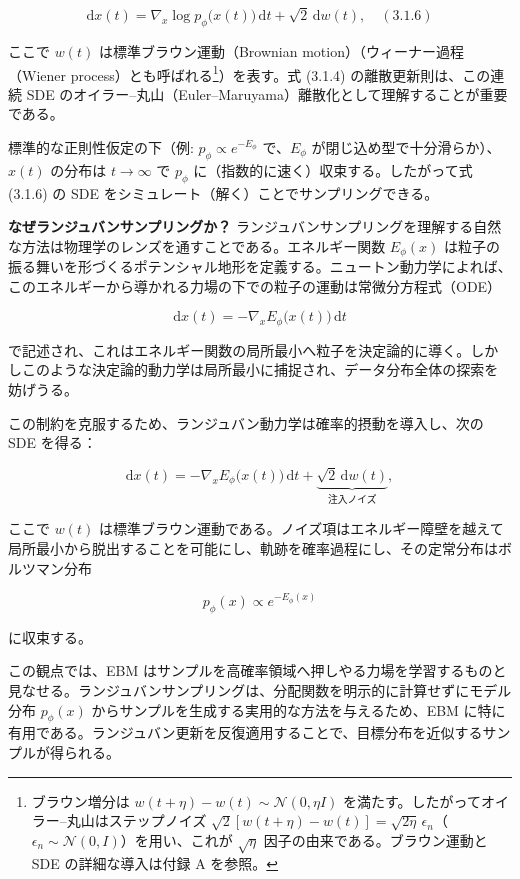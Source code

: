 \[
\mathrm{d}x(t) = \nabla_x \log p_\phi\bigl(x(t)\bigr)\,\mathrm{d}t + \sqrt{2}\,\mathrm{d}w(t),\quad (3.1.6)
\]


ここで $w(t)$ は標準ブラウン運動（Brownian motion）（ウィーナー過程（Wiener process）とも呼ばれる\footnote{ブラウン増分は $w(t+\eta)-w(t)\sim\mathcal{N}(0,\eta I)$ を満たす。したがってオイラー–丸山はステップノイズ $\sqrt{2}[w(t+\eta)-w(t)]=\sqrt{2\eta}\,\epsilon_n$（$\epsilon_n\sim\mathcal{N}(0,I)$）を用い、これが $\sqrt{\eta}$ 因子の由来である。ブラウン運動と SDE の詳細な導入は付録 A を参照。}）を表す。式 (3.1.4) の離散更新則は、この連続 SDE のオイラー–丸山（Euler–Maruyama）離散化として理解することが重要である。

標準的な正則性仮定の下（例: $p_\phi \propto e^{-E_\phi}$ で、$E_\phi$ が閉じ込め型で十分滑らか）、$x(t)$ の分布は $t \to \infty$ で $p_\phi$ に（指数的に速く）収束する。したがって式 (3.1.6) の SDE をシミュレート（解く）ことでサンプリングできる。

\textbf{なぜランジュバンサンプリングか？} ランジュバンサンプリングを理解する自然な方法は物理学のレンズを通すことである。エネルギー関数 $E_\phi(x)$ は粒子の振る舞いを形づくるポテンシャル地形を定義する。ニュートン動力学によれば、このエネルギーから導かれる力場の下での粒子の運動は常微分方程式（ODE）

\[
\mathrm{d}x(t) = -\nabla_x E_\phi\bigl(x(t)\bigr)\,\mathrm{d}t
\]


で記述され、これはエネルギー関数の局所最小へ粒子を決定論的に導く。しかしこのような決定論的動力学は局所最小に捕捉され、データ分布全体の探索を妨げうる。

この制約を克服するため、ランジュバン動力学は確率的摂動を導入し、次の SDE を得る：

\[
\mathrm{d}x(t) = -\nabla_x E_\phi\bigl(x(t)\bigr)\,\mathrm{d}t + \underbrace{\sqrt{2}\,\mathrm{d}w(t)}_{\text{注入ノイズ}},
\]


ここで $w(t)$ は標準ブラウン運動である。ノイズ項はエネルギー障壁を越えて局所最小から脱出することを可能にし、軌跡を確率過程にし、その定常分布はボルツマン分布

\[
p_\phi(x) \propto e^{-E_\phi(x)}
\]


に収束する。

この観点では、EBM はサンプルを高確率領域へ押しやる力場を学習するものと見なせる。ランジュバンサンプリングは、分配関数を明示的に計算せずにモデル分布 $p_\phi(x)$ からサンプルを生成する実用的な方法を与えるため、EBM に特に有用である。ランジュバン更新を反復適用することで、目標分布を近似するサンプルが得られる。

